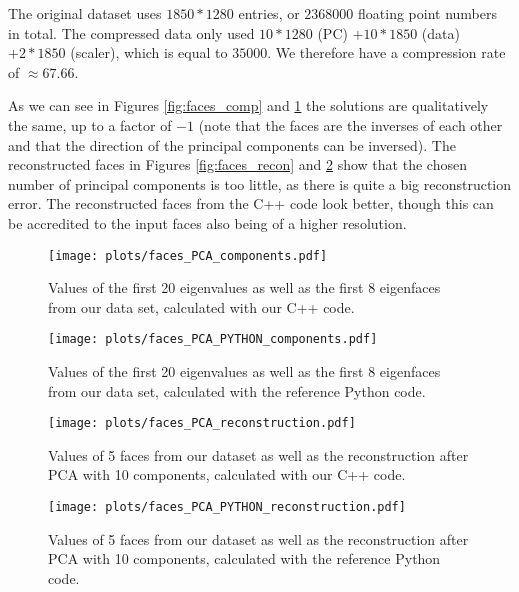 \documentclass[a4paper,10pt]{article} %
\begin{document}
The original dataset uses $1850 * 1280$ entries, or $2368000$ floating point numbers in total.
The compressed data only used $10 * 1280$ (PC) $+ 10 * 1850$ (data) $+ 2 * 1850$ (scaler), which is equal to $35000$. We therefore have a compression rate of $\approx 67.66$.

As we can see in Figures \ref{fig:faces_comp} and \ref{fig:faces_comp_python} the solutions are qualitatively the same, up to a factor of $-1$ (note that the faces are the inverses of each other and that the direction of the principal components can be inversed). The reconstructed faces in Figures \ref{fig:faces_recon} and \ref{fig:faces_recon_python} show that the chosen number of principal components is too little, as there is quite a big reconstruction error. The reconstructed faces from the C++ code look better, though this can be accredited to the input faces also being of a higher resolution.

\begin{figure}[H]
  \centering
  \begin{minipage}[t]{0.7\textwidth}
    \texttt{[image: plots/faces\_PCA\_components.pdf]}
    \caption{Values of the first 20 eigenvalues as well as the first 8 eigenfaces from our data set, calculated with our C++ code.}
    \label{fig:faces_comp}
  \end{minipage}
  \hfill
  \begin{minipage}[t]{0.7\textwidth}
    \texttt{[image: plots/faces\_PCA\_PYTHON\_components.pdf]}
    \caption{Values of the first 20 eigenvalues as well as the first 8 eigenfaces from our data set, calculated with the reference Python code.}
    \label{fig:faces_comp_python}
  \end{minipage}
\end{figure}

\begin{figure}[h]
  \centering
  \begin{minipage}[t]{0.7\textwidth}
    \texttt{[image: plots/faces\_PCA\_reconstruction.pdf]}
    \caption{Values of 5 faces from our dataset as well as the reconstruction after PCA with 10 components, calculated with our C++ code.}
    \label{fig:faces_recon}
  \end{minipage}
  \hfill
  \begin{minipage}[t]{0.7\textwidth}
    \texttt{[image: plots/faces\_PCA\_PYTHON\_reconstruction.pdf]}
    \caption{Values of 5 faces from our dataset as well as the reconstruction after PCA with 10 components, calculated with the reference Python code.}
    \label{fig:faces_recon_python}
  \end{minipage}
\end{figure}
\end{document}
